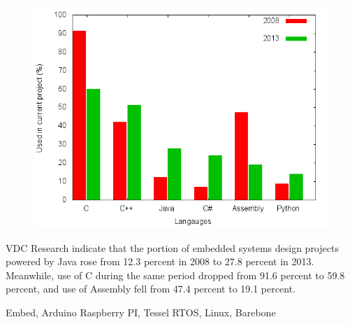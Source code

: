 \begin{figure}[H]
  \begin{center}
    \includegraphics[scale=0.5]{figures/plots/langs.png}
  \end{center}
  \caption{}
  \label{fig:vdc:langs}
\end{figure}


VDC Research indicate that the portion of embedded systems design projects powered by Java rose from 12.3 percent in 2008 to 27.8 percent in 2013. Meanwhile, use of C during the same period dropped from 91.6 percent to 59.8 percent, and use of Assembly fell from 47.4 percent to 19.1 percent.



Embed, Arduino
Raspberry PI, Tessel
RTOS, Linux, Barebone
